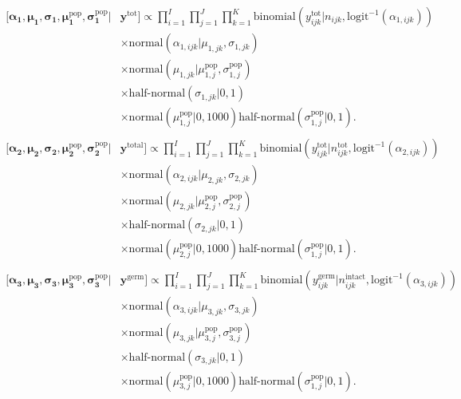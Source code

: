 \documentclass[12pt, oneside, titlepage]{article}   	%
\begin{document}
\begin{align}
  \begin{split}
 [  \bm{\alpha_1} , \bm{\mu_1} , \bm{\sigma_1} , \bm{\mu^\mathrm{pop}_1}, \bm{\sigma^\mathrm{pop}_1} | & \bm{y^{\mathrm{tot}}}  ] \propto \prod_{i=1}^{I}   \prod_{j=1}^{J}  \prod_{k=1}^{K} 
   \mathrm{binomial} ( y^{\mathrm{tot}}_{ijk} | n_{ijk}, \mathrm{logit}^{-1}( \alpha_{1,ijk} ) ) 
   \\ & \times \mathrm{normal} ( \alpha_{1,ijk}  | \mu_{1,jk}, \sigma{_{1,jk} })
  \\ & \times \mathrm{normal} ( \mu_{1,jk}  | \mu^\mathrm{pop}_{1,j}, \sigma^\mathrm{pop}_{1,j} )
  \\ & \times \textrm{half-normal} ( \sigma_{1,jk} | 0,1)
  \\ & \times \mathrm{normal} ( \mu^\mathrm{pop}_{1,j} | 0 , 1000 ) \textrm{half-normal} ( \sigma^\mathrm{pop}_{1,j} | 0,1).
  \end{split}
\end{align}
%
\begin{align}
  \begin{split}
 [  \bm{\alpha_2} , \bm{\mu_2} , \bm{\sigma_2} , \bm{\mu^\mathrm{pop}_2}, \bm{\sigma^\mathrm{pop}_2} | & \bm{y^{\mathrm{total}}}  ] \propto \prod_{i=1}^{I}   \prod_{j=1}^{J}  \prod_{k=1}^{K} 
   \mathrm{binomial} ( y^{\mathrm{tot}}_{ijk} | n^\mathrm{tot}_{ijk}, \mathrm{logit}^{-1}( \alpha_{2,ijk} ) ) 
   \\ & \times \mathrm{normal} ( \alpha_{2,ijk}  | \mu_{2,jk}, \sigma{_{2,jk} })
  \\ & \times \mathrm{normal} ( \mu_{2,jk}  | \mu^\mathrm{pop}_{2,j}, \sigma^\mathrm{pop}_{2,j} )
  \\ & \times \textrm{half-normal} ( \sigma_{2,jk} | 0,1)
  \\ & \times \mathrm{normal} ( \mu^\mathrm{pop}_{2,j} | 0 , 1000 ) \textrm{half-normal} ( \sigma^\mathrm{pop}_{1,j} | 0,1).
  \end{split}
\end{align}
%
\begin{align}
  \begin{split}
 [  \bm{\alpha_3} , \bm{\mu_3} , \bm{\sigma_3} , \bm{\mu^\mathrm{pop}_3}, \bm{\sigma^\mathrm{pop}_3} | & \bm{y^{\mathrm{germ}}}  ] \propto \prod_{i=1}^{I}   \prod_{j=1}^{J}  \prod_{k=1}^{K} 
   \mathrm{binomial} ( y^{\mathrm{germ}}_{ijk} | n^\mathrm{intact}_{ijk}, \mathrm{logit}^{-1}( \alpha_{3,ijk} ) ) 
   \\ & \times \mathrm{normal} ( \alpha_{3,ijk}  | \mu_{3,jk}, \sigma{_{3,jk} })
  \\ & \times \mathrm{normal} ( \mu_{3,jk}  | \mu^\mathrm{pop}_{3,j}, \sigma^\mathrm{pop}_{3,j} )
  \\ & \times \textrm{half-normal} ( \sigma_{3,jk} | 0,1)
  \\ & \times \mathrm{normal} ( \mu^\mathrm{pop}_{3,j} | 0 , 1000 ) \textrm{half-normal} ( \sigma^\mathrm{pop}_{1,j} | 0,1).
  \end{split}
\end{align}
\end{document}
